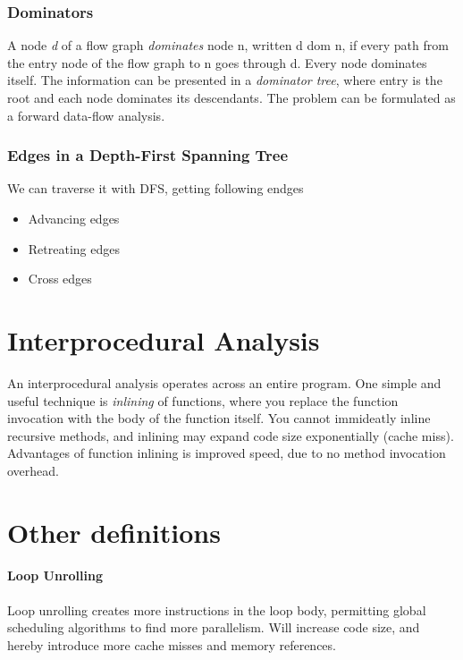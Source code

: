 \documentclass{article}
\begin{document}
		\subsubsection{Dominators} %
		\label{ssub:Dominators}
		A node \emph{d} of a flow graph \emph{dominates} node n, written d dom n, if every path from the entry node of the flow graph to n goes through d. Every node dominates itself. The information can be presented in a \emph{dominator tree}, where entry is the root and each node dominates its descendants. The problem can be formulated as a forward data-flow analysis.

		\subsubsection{Edges in a Depth-First Spanning Tree} %
		\label{ssub:Edges in a Depth-First Spanning Tree}	
		We can traverse it with DFS, getting following endges
		\begin{itemize}
			\item Advancing edges
			\item Retreating edges
			\item Cross edges
		\end{itemize}



\section{Interprocedural Analysis} %
\label{sec:Interprocedural Analysis}
An interprocedural analysis operates across an entire program. One simple and useful technique is \emph{inlining} of functions, where you replace the function invocation with the body of the function itself. You cannot immideatly inline recursive methods, and inlining may expand code size exponentially (cache miss). Advantages of function inlining is improved speed, due to no method invocation overhead.



\section{Other definitions} %
\label{sec:Other definitions}

\paragraph{Loop Unrolling} %
\label{par:Loop Unrolling}
Loop unrolling creates more instructions in the loop body, permitting global scheduling algorithms to find more parallelism. Will increase code size, and hereby introduce more cache misses and memory references.

\end{document}
